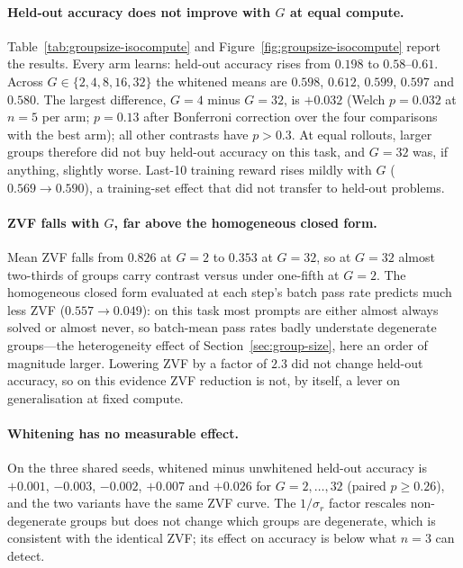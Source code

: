 \paragraph{Held-out accuracy does not improve with $G$ at equal compute.}
Table~\ref{tab:groupsize-isocompute} and Figure~\ref{fig:groupsize-isocompute}
report the results. Every arm learns: held-out accuracy rises from $0.198$ to
$0.58$--$0.61$. Across $G\in\{2,4,8,16,32\}$ the whitened means are $0.598$,
$0.612$, $0.599$, $0.597$ and $0.580$. The largest difference, $G{=}4$ minus
$G{=}32$, is $+0.032$ (Welch $p{=}0.032$ at $n{=}5$ per arm; $p{=}0.13$ after
Bonferroni correction over the four comparisons with the best arm); all other
contrasts have $p>0.3$. At equal rollouts, larger groups therefore did not buy
held-out accuracy on this task, and $G{=}32$ was, if anything, slightly worse.
Last-10 training reward rises mildly with $G$ ($0.569\to0.590$), a training-set
effect that did not transfer to held-out problems.

\paragraph{ZVF falls with $G$, far above the homogeneous closed form.}
Mean ZVF falls from $0.826$ at $G{=}2$ to $0.353$ at $G{=}32$, so at $G{=}32$ almost
two-thirds of groups carry contrast versus under one-fifth at $G{=}2$. The
homogeneous closed form evaluated at each step's batch pass rate predicts much less
ZVF ($0.557\to0.049$): on this task most prompts are either almost always solved or
almost never, so batch-mean pass rates badly understate degenerate groups---the
heterogeneity effect of Section~\ref{sec:group-size}, here an order of magnitude
larger. Lowering ZVF by a factor of $2.3$ did not change held-out accuracy, so on
this evidence ZVF reduction is not, by itself, a lever on generalisation at
fixed compute.

\paragraph{Whitening has no measurable effect.}
On the three shared seeds, whitened minus unwhitened held-out accuracy is $+0.001$,
$-0.003$, $-0.002$, $+0.007$ and $+0.026$ for $G{=}2,\dots,32$ (paired $p\ge0.26$),
and the two variants have the same ZVF curve. The $1/\sigma_r$ factor rescales
non-degenerate groups but does not change which groups are degenerate, which is
consistent with the identical ZVF; its effect on accuracy is below what $n{=}3$
can detect.

